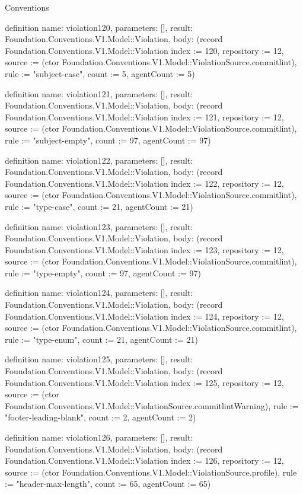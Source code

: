 \begin{lexlean}{Conventions}
\begin{semanticmodule}
definition{
  name: violation120,
  parameters: [],
  result: Foundation.Conventions.V1.Model::Violation,
  body: (record Foundation.Conventions.V1.Model::Violation {index := 120, repository := 12, source := (ctor Foundation.Conventions.V1.Model::ViolationSource.commitlint), rule := "subject-case", count := 5, agentCount := 5})
}

definition{
  name: violation121,
  parameters: [],
  result: Foundation.Conventions.V1.Model::Violation,
  body: (record Foundation.Conventions.V1.Model::Violation {index := 121, repository := 12, source := (ctor Foundation.Conventions.V1.Model::ViolationSource.commitlint), rule := "subject-empty", count := 97, agentCount := 97})
}

definition{
  name: violation122,
  parameters: [],
  result: Foundation.Conventions.V1.Model::Violation,
  body: (record Foundation.Conventions.V1.Model::Violation {index := 122, repository := 12, source := (ctor Foundation.Conventions.V1.Model::ViolationSource.commitlint), rule := "type-case", count := 21, agentCount := 21})
}

definition{
  name: violation123,
  parameters: [],
  result: Foundation.Conventions.V1.Model::Violation,
  body: (record Foundation.Conventions.V1.Model::Violation {index := 123, repository := 12, source := (ctor Foundation.Conventions.V1.Model::ViolationSource.commitlint), rule := "type-empty", count := 97, agentCount := 97})
}

definition{
  name: violation124,
  parameters: [],
  result: Foundation.Conventions.V1.Model::Violation,
  body: (record Foundation.Conventions.V1.Model::Violation {index := 124, repository := 12, source := (ctor Foundation.Conventions.V1.Model::ViolationSource.commitlint), rule := "type-enum", count := 21, agentCount := 21})
}

definition{
  name: violation125,
  parameters: [],
  result: Foundation.Conventions.V1.Model::Violation,
  body: (record Foundation.Conventions.V1.Model::Violation {index := 125, repository := 12, source := (ctor Foundation.Conventions.V1.Model::ViolationSource.commitlintWarning), rule := "footer-leading-blank", count := 2, agentCount := 2})
}

definition{
  name: violation126,
  parameters: [],
  result: Foundation.Conventions.V1.Model::Violation,
  body: (record Foundation.Conventions.V1.Model::Violation {index := 126, repository := 12, source := (ctor Foundation.Conventions.V1.Model::ViolationSource.profile), rule := "header-max-length", count := 65, agentCount := 65})
}


\end{semanticmodule}
\end{lexlean}
